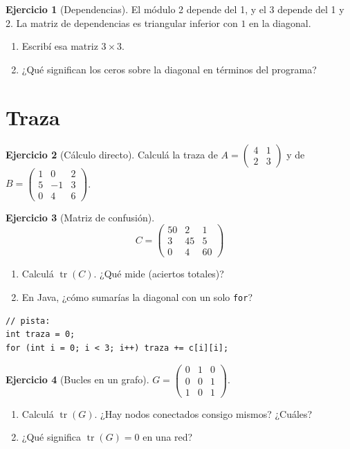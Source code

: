 \documentclass[a4paper,12pt]{article}
\theoremstyle{definition}
\newtheorem{ejercicio}{Ejercicio}[section]
\begin{document}
\begin{ejercicio}[Dependencias]
El módulo 2 depende del 1, y el 3 depende del 1 y 2. La matriz de dependencias es triangular inferior con $1$ en la diagonal.
\begin{enumerate}[label=\alph*)]
\item Escribí esa matriz $3 \times 3$.
\item ¿Qué significan los ceros sobre la diagonal en términos del programa?
\end{enumerate}
\end{ejercicio}

\section{Traza}
\begin{ejercicio}[Cálculo directo]
Calculá la traza de $A = \begin{pmatrix} 4 & 1 \\ 2 & 3 \end{pmatrix}$ y de $B = \begin{pmatrix} 1 & 0 & 2 \\ 5 & -1 & 3 \\ 0 & 4 & 6 \end{pmatrix}$.
\end{ejercicio}

\begin{ejercicio}[Matriz de confusión]
\[
C = \begin{pmatrix}
50 & 2 & 1 \\
3 & 45 & 5 \\
0 & 4 & 60
\end{pmatrix}
\]
\begin{enumerate}[label=\alph*)]
\item Calculá $\operatorname{tr}(C)$. ¿Qué mide (aciertos totales)?
\item En Java, ¿cómo sumarías la diagonal con un solo \texttt{for}?
\end{enumerate}
\begin{lstlisting}
// pista:
int traza = 0;
for (int i = 0; i < 3; i++) traza += c[i][i];
\end{lstlisting}
\end{ejercicio}

\begin{ejercicio}[Bucles en un grafo]
$G = \begin{pmatrix} 0 & 1 & 0 \\ 0 & 0 & 1 \\ 1 & 0 & 1 \end{pmatrix}$.
\begin{enumerate}[label=\alph*)]
\item Calculá $\operatorname{tr}(G)$. ¿Hay nodos conectados consigo mismos? ¿Cuáles?
\item ¿Qué significa $\operatorname{tr}(G)=0$ en una red?
\end{enumerate}
\end{ejercicio}
\end{document}
